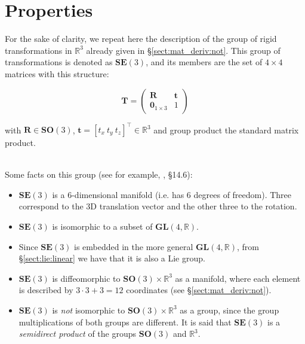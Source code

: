 \documentclass[a4paper,11pt]{report}
\begin{document}
\section{Properties}

For the sake of clarity, we repeat here the description of
the group of rigid transformations in $\mathbb{R}^3$ already given
in \S\ref{sect:mat_deriv:not}.
This group of transformations is denoted as $\mathbf{SE}(3)$,
and its members are the set of $4 \times 4$ matrices with this structure:

\begin{equation}
\label{eq:T_Rt_bis}
 \mathbf{T} =
\left(
\begin{array}{c|c}
  \mathbf{R} & \mathbf{t} \\
\hline
  \mathbf{0}_{1\times 3} & 1
\end{array}
\right)
\end{equation}

\noindent with $\mathbf{R} \in \mathbf{SO}(3)$,
$\mathbf{t}=[t_x ~ t_y ~ t_z]^\top \in \mathbb{R}^3$
and group product the standard matrix product.

~\\

Some facts on this group (see for example, \cite{gallier2001geometric}, \S14.6):

\begin{itemize}
 \item $\mathbf{SE}(3)$ is a 6-dimensional manifold (i.e. has 6 degrees of freedom). Three correspond to the 3D translation vector and the other three to the rotation.
 \item  $\mathbf{SE}(3)$ is isomorphic to a subset of $\mathbf{GL}(4,\mathbb{R})$.
 \item Since $\mathbf{SE}(3)$ is embedded in the more general $\mathbf{GL}(4,\mathbb{R})$,
         from \S\ref{sect:lie:linear} we have that it is also a Lie group.
 \item  $\mathbf{SE}(3)$ is diffeomorphic to $\mathbf{SO}(3) \times \mathbb{R}^3$ as a manifold,
  where each element is described by $3\cdot 3+3=12$ coordinates (see \S\ref{sect:mat_deriv:not}).
 \item  $\mathbf{SE}(3)$ is \emph{not} isomorphic to $\mathbf{SO}(3) \times \mathbb{R}^3$ as a group,
since the group multiplications of both groups are different.
It is said that $\mathbf{SE}(3)$ is a \emph{semidirect product} of
the groups $\mathbf{SO}(3)$ and $\mathbb{R}^3$.
\end{itemize}
\end{document}
